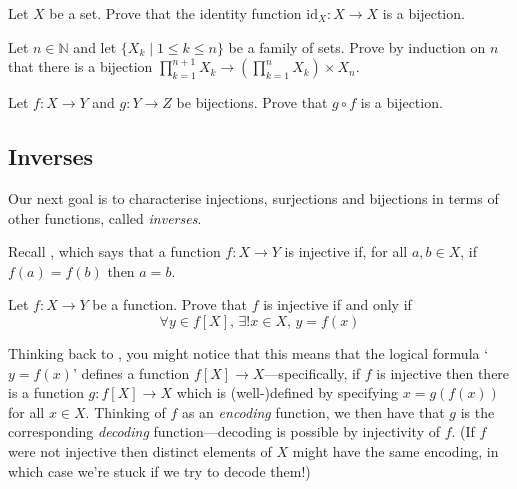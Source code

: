 \begin{exercise}
\label{exIdentityBijection}
Let $X$ be a set. Prove that the identity function $\mathrm{id}_X : X \to X$ is a bijection.
\end{exercise}

\begin{exercise}
Let $n \in \mathbb{N}$ and let $\{ X_k \mid 1 \le k \le n \}$ be a family of sets. Prove by induction on $n$ that there is a bijection $\displaystyle \prod_{k=1}^{n+1} X_k \to \left( \prod_{k=1}^n X_k \right) \times X_n$.
\end{exercise}

\begin{exercise}
\label{exCompositeOfBijectionsIsBijection}
Let $f : X \to Y$ and $g : Y \to Z$ be bijections. Prove that $g \circ f$ is a bijection.
\end{exercise}

\subsection*{Inverses}

Our next goal is to characterise injections, surjections and bijections in terms of other functions, called \textit{inverses}.

Recall , which says that a function $f : X \to Y$ is injective if, for all $a,b \in X$, if $f(a)=f(b)$ then $a=b$.

\begin{exercise}
Let $f : X \to Y$ be a function. Prove that $f$ is injective if and only if
\[ \forall y \in f[X],\, \exists ! x \in X,\, y=f(x) \]
\end{exercise}

Thinking back to , you might notice that this means that the logical formula `$y=f(x)$' defines a function $f[X] \to X$---specifically, if $f$ is injective then there is a function $g : f[X] \to X$ which is (well-)defined by specifying $x=g(f(x))$ for all $x \in X$. Thinking of $f$ as an \textit{encoding} function, we then have that $g$ is the corresponding \textit{decoding} function---decoding is possible by injectivity of $f$. (If $f$ were not injective then distinct elements of $X$ might have the same encoding, in which case we're stuck if we try to decode them!)

